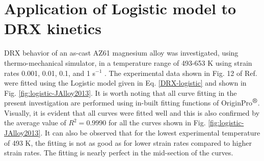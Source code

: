 \documentclass[a4paper, 11pt, dvipsnames]{article}
\begin{document}
\section{Application of Logistic model to DRX kinetics}
DRX behavior of an as-cast AZ61 magnesium alloy was investigated, using thermo-mechanical simulator, in a temperature range of 493-653 K using strain rates 0.001, 0.01, 0.1, and 1 s$^{-1}$ \cite{Z1}. The experimental data shown in Fig. 12 of Ref. \cite{Z1} were fitted using the Logistic model given in Eq. \eqref{DRX-logistic} and shown in Fig. \ref{fig:logistic-JAlloy2013}. It is worth noting that all curve fitting in the present investigation are performed using in-built fitting functions of OriginPro$^{\text{\small\textregistered}}$. Visually, it is evident that all curves were fitted well and this is also confirmed by the average value of $R^2 = 0.9990$ for all the curves shown in Fig. \ref{fig:logistic-JAlloy2013}. It can also be observed that for the lowest experimental temperature of 493 K, the fitting is not as good as for lower strain rates compared to higher strain rates. The fitting is nearly perfect in the mid-section of the curves. 
\end{document}
